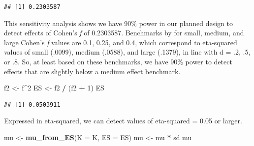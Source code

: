 \documentclass[
]{book}
\newenvironment{Shaded}{\begin{snugshade}}{\end{snugshade}}
\newcommand{\CommentTok}[1]{\textcolor[rgb]{0.56,0.35,0.01}{\textit{#1}}}
\newcommand{\DataTypeTok}[1]{\textcolor[rgb]{0.13,0.29,0.53}{#1}}
\newcommand{\DecValTok}[1]{\textcolor[rgb]{0.00,0.00,0.81}{#1}}
\newcommand{\FloatTok}[1]{\textcolor[rgb]{0.00,0.00,0.81}{#1}}
\newcommand{\KeywordTok}[1]{\textcolor[rgb]{0.13,0.29,0.53}{\textbf{#1}}}
\newcommand{\NormalTok}[1]{#1}
\newcommand{\OperatorTok}[1]{\textcolor[rgb]{0.81,0.36,0.00}{\textbf{#1}}}
\newcommand{\StringTok}[1]{\textcolor[rgb]{0.31,0.60,0.02}{#1}}
\begin{document}
\begin{Shaded}
\end{Shaded}

\begin{verbatim}
## [1] 0.2303587
\end{verbatim}

This sensitivity analysis shows we have 90\% power in our planned design to detect effects of Cohen's \emph{f} of 0.2303587. Benchmarks by \citet{cohen1988spa} for small, medium, and large Cohen's \emph{f} values are 0.1, 0.25, and 0.4, which correspond to eta-squared values of small (.0099), medium (.0588), and large (.1379), in line with d = .2, .5, or .8. So, at least based on these benchmarks, we have 90\% power to detect effects that are slightly below a medium effect benchmark.

\begin{Shaded}
\begin{Highlighting}[]
\NormalTok{f2 <-}\StringTok{ }\NormalTok{f}\OperatorTok{^}\DecValTok{2}
\NormalTok{ES <-}\StringTok{ }\NormalTok{f2 }\OperatorTok{/}\StringTok{ }\NormalTok{(f2 }\OperatorTok{+}\StringTok{ }\DecValTok{1}\NormalTok{)}
\NormalTok{ES}
\end{Highlighting}
\end{Shaded}

\begin{verbatim}
## [1] 0.0503911
\end{verbatim}

Expressed in eta-squared, we can detect values of eta-squared = 0.05 or larger.

\begin{Shaded}
\begin{Highlighting}[]
\NormalTok{mu <-}\StringTok{ }\KeywordTok{mu_from_ES}\NormalTok{(}\DataTypeTok{K =}\NormalTok{ K, }\DataTypeTok{ES =}\NormalTok{ ES)}
\NormalTok{mu <-}\StringTok{ }\NormalTok{mu }\OperatorTok{*}\StringTok{ }\NormalTok{sd}
\NormalTok{mu}
\end{Highlighting}
\end{Shaded}
\end{document}
